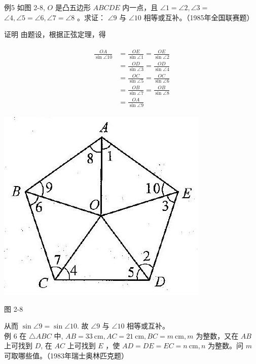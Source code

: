 \documentclass[10pt]{article}
\begin{document}
例5 如图 2-8, $O$ 是凸五边形 $A B C D E$ 内一点，且 $\angle 1=\angle 2, \angle 3=$ $\angle 4, \angle 5=\angle 6, \angle 7=\angle 8$ 。求证： $\angle 9$ 与 $\angle 10$ 相等或互补。（1985年全国联赛题）

证明 由题设，根据正弦定理，得

\begin{align*}
\begin{aligned}
\frac{O A}{\sin \angle 10} & =\frac{O E}{\sin \angle 1}=\frac{O E}{\sin \angle 2} \\
& =\frac{O D}{\sin \angle 3}=\frac{O D}{\sin \angle 4} \\
& =\frac{O C}{\sin \angle 5}=\frac{O C}{\sin \angle 6} \\
& =\frac{O B}{\sin \angle 7}=\frac{O B}{\sin \angle 8} \\
& =\frac{O A}{\sin \angle 9}
\end{aligned}
\end{align*}

\begin{center}
\includegraphics[max width=\textwidth]{2024_10_30_2c8f45efd4a519b08e1ag-020}
\end{center}

图 2-8

从而 $\sin \angle 9=\sin \angle 10$. 故 $\angle 9$ 与 $\angle 10$ 相等或互补。\\
例 6 在 $\triangle A B C$ 中, $A B=33 \mathrm{~cm}, A C=21 \mathrm{~cm}, B C=m \mathrm{~cm}, m$ 为整数，又在 $A B$ 上可找到 $D$, 在 $A C$ 上可找到 $E$ ，使 $A D=D E=E C=n \mathrm{~cm}, n$ 为整数。问 $m$ 可取哪些值。（1983年瑞士奥林匹克题）
\end{document}
